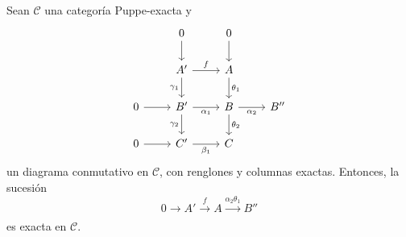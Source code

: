 \documentclass[tesis]{subfiles}
\begin{document}
\begin{Lema}\label{Mendoza-1.7.6}
    Sean $\mathscr{C}$ una categoría Puppe-exacta y
    \begin{equation} \label{eq: Mendoza-1.7.6-1}
        \begin{tikzcd}
            &0 \arrow[]{d}[]{} &0 \arrow[]{d}[]{} \\
            &A' \arrow[]{d}[swap]{\gamma_1} \arrow[]{r}[]{f} &A \arrow[]{d}[]{\theta_1} \\
            0 \arrow[]{r}[]{} &B' \arrow[]{d}[swap]{\gamma_2} \arrow[]{r}[swap]{\alpha_1} &B \arrow[]{d}[]{\theta_2} \arrow[]{r}[swap]{\alpha_2} &B'' \\
            0 \arrow[]{r}[]{} &C' \arrow[]{r}[swap]{\beta_1} &C
        \end{tikzcd}
    \end{equation}
    un diagrama conmutativo en $\mathscr{C}$, con renglones y columnas exactas. Entonces, la sucesión
    \[
    0\to A'\xrightarrow[]{f} A\xrightarrow[]{\alpha_2\theta_1} B''
    \] 
    es exacta en $\mathscr{C}$.
    
\end{Lema}
\end{document}
